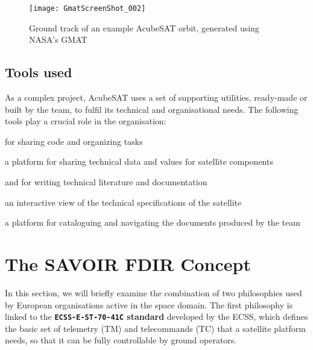 \documentclass[a4paper,nobib,final]{tufte-book}
\begin{document}
\begin{figure}
	\texttt{[image: GmatScreenShot\_002]}
	\caption[Ground track of an example AcubeSAT orbit, generated using NASA's GMAT]{Ground track of an example AcubeSAT orbit, generated using NASA's \acl{GMAT} \autocite{nasa_general_mission}}
	\label{fig:gmat}
\end{figure}


\section{Tools used}

As a complex project, AcubeSAT uses a set of supporting utilities, ready-made or built by the team, to fulfil its technical and organisational needs. The following tools play a crucial role in the organisation:
\begin{compactitem}
	\item {} for sharing code and organizing tasks
	\item {} a platform for sharing technical data and values for satellite components
	\item {} and  for writing technical literature and documentation
	\item {} an interactive view of the technical specifications of the satellite
	\item {} a platform for cataloguing and navigating the documents produced by the team
\end{compactitem}

\chapter{The SAVOIR \acs{FDIR} Concept}
\label{cap:savoir}

In this section, we will briefly examine the combination of two philosophies used by European organisations active in the space domain. The first philosophy is linked to the \textbf{\texttt{ECSS-E-ST-70-41C} standard} \autocite{ECSS-E-ST-70-41C} developed by the \acf{ECSS}, which defines the basic set of telemetry (\acs{TM}) and telecommands (\acs{TC}) that a satellite platform needs, so that it can be fully controllable by ground operators.
\end{document}

